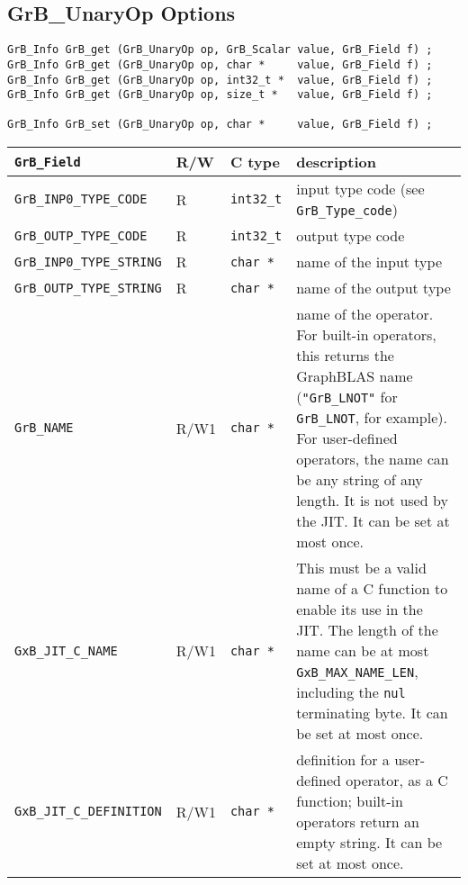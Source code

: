 \newpage
\subsection{{\sf GrB\_UnaryOp} Options}
\label{get_set_unop}

\begin{mdframed}[userdefinedwidth=6in]
{\footnotesize
\begin{verbatim}
GrB_Info GrB_get (GrB_UnaryOp op, GrB_Scalar value, GrB_Field f) ;
GrB_Info GrB_get (GrB_UnaryOp op, char *     value, GrB_Field f) ;
GrB_Info GrB_get (GrB_UnaryOp op, int32_t *  value, GrB_Field f) ;
GrB_Info GrB_get (GrB_UnaryOp op, size_t *   value, GrB_Field f) ;

GrB_Info GrB_set (GrB_UnaryOp op, char *     value, GrB_Field f) ;
\end{verbatim}
}\end{mdframed}

\noindent
{\small
\begin{tabular}{|l|l|l|p{2.8in}|}
\hline
\verb'GrB_Field'                    & R/W  & C type        & description \\
\hline
\verb'GrB_INP0_TYPE_CODE'          & R    & \verb'int32_t'& input type code (see \verb'GrB_Type_code') \\
\verb'GrB_OUTP_TYPE_CODE'          & R    & \verb'int32_t'& output type code \\
\verb'GrB_INP0_TYPE_STRING'        & R    & \verb'char *' & name of the input type \\
\verb'GrB_OUTP_TYPE_STRING'        & R    & \verb'char *' & name of the output type \\
\hline
\verb'GrB_NAME'                     & R/W1 & \verb'char *' &    %
    name of the operator.  For built-in operators, this returns the GraphBLAS
    name (\verb'"GrB_LNOT"' for \verb'GrB_LNOT', for example).
    For user-defined operators, the name can be any string of any length.  It
    is not used by the JIT.  It can be set at most once. \\
\verb'GxB_JIT_C_NAME'               & R/W1 & \verb'char *' &
    This must be a valid name of a C function to enable its use in the JIT.
    The length of the name can be at most \verb'GxB_MAX_NAME_LEN', including
    the \verb'nul' terminating byte.  It can be set at most once. \\
\verb'GxB_JIT_C_DEFINITION'         & R/W1 & \verb'char *' &
    definition for a user-defined operator, as a C function; built-in operators
    return an empty string.  It can be set at most once. \\
\hline
\end{tabular}
}

